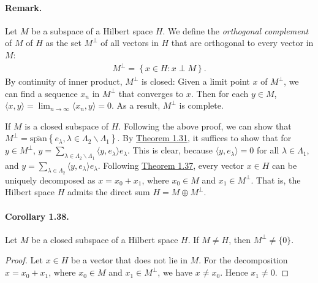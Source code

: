 \documentclass{article}
\begin{document}
\paragraph{Remark.} Let $M$ be a subspace of a Hilbert space $H$. We define the \textit{orthogonal complement} of $M$ of $H$ as the set $M^\perp$ of all vectors in $H$ that are orthogonal to every vector in $M$:
\begin{align*}
	M^\perp = \left\{x\in H:x\perp M\right\}.
\end{align*}
By continuity of inner product, $M^\perp$ is closed: Given a limit point $x$ of $M^\perp$, we can find a sequence $x_n$ in $M^\perp$ that converges to $x$. Then for each $y\in M$, $\langle x,y\rangle = \lim_{n\to\infty}\langle x_n,y\rangle = 0$. As a result, $M^\perp$ is complete.
\vspace{0.1cm}

If $M$ is a closed subspace of $H$. Following the above proof, we can show that $M^\perp = \overline{\mathrm{span}}\left\{e_\lambda,\lambda\in\Lambda_2\backslash\Lambda_1\right\}$. By \hyperref[thm:1.31]{Theorem 1.31}, it suffices to show that for $y\in M^\perp$, $y=\sum_{\lambda\in\Lambda_2\backslash\Lambda_1}\langle y,e_\lambda\rangle e_\lambda$. This is clear, because $\langle y,e_\lambda\rangle=0$ for all $\lambda\in\Lambda_1$, and $y=\sum_{\lambda\in\Lambda_2}\langle y,e_\lambda\rangle e_\lambda$. Following \hyperref[thm:1.37]{Theorem 1.37}, every vector $x\in H$ can be uniquely decomposed as $x=x_0+x_1$, where $x_0\in M$ and $x_1\in M^\perp$. That is, the Hilbert space $H$ admits the direct sum $H=M\oplus M^\perp$.

\paragraph{Corollary 1.38.\label{cor:1.38}} Let $M$ be a closed subspace of a Hilbert space $H$. If $M\neq H$, then $M^\perp\neq\{0\}$.
\begin{proof}
Let $x\in H$ be a vector that does not lie in $M$. For the decomposition $x=x_0+x_1$, where $x_0\in M$ and $x_1\in M^\perp$, we have $x\neq x_0$. Hence $x_1\neq 0$.
\end{proof}
\end{document}
